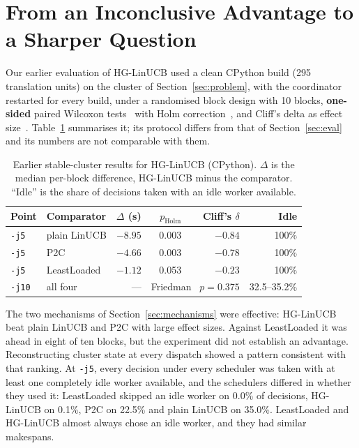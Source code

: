 \documentclass[final,5p,times,twocolumn]{elsarticle}
\begin{document}
\section{From an Inconclusive Advantage to a Sharper Question}
\label{sec:question}

Our earlier evaluation of HG-LinUCB used a clean CPython build (295 translation units) on the cluster of Section~\ref{sec:problem}, with the coordinator restarted for every build, under a randomised block design with 10 blocks, \textbf{one-sided} paired Wilcoxon tests~\cite{wilcoxon1945} with Holm correction~\cite{holm1979}, and Cliff's delta as effect size~\cite{cliff1993}. Table~\ref{tab:earlier} summarises it; its protocol differs from that of Section~\ref{sec:eval} and its numbers are not comparable with them.

\begin{table}[t]
\centering
\caption{Earlier stable-cluster results for HG-LinUCB (CPython). $\Delta$ is the median per-block difference, HG-LinUCB minus the comparator. ``Idle'' is the share of decisions taken with an idle worker available.}
\label{tab:earlier}
\footnotesize
\setlength{\tabcolsep}{3pt}
\begin{tabular}{llrrrr}
\toprule
Point & Comparator & $\Delta$ (s) & $p_{\text{Holm}}$ & Cliff's $\delta$ & Idle \\
\midrule
\texttt{-j5} & plain LinUCB & $-8.95$ & 0.003 & $-0.84$ & 100\% \\
\texttt{-j5} & P2C & $-4.66$ & 0.003 & $-0.78$ & 100\% \\
\texttt{-j5} & LeastLoaded & $-1.12$ & 0.053 & $-0.23$ & 100\% \\
\texttt{-j10} & all four & --- & \multicolumn{2}{l}{Friedman~\cite{friedman1937} $p=0.375$} & 32.5--35.2\% \\
\bottomrule
\end{tabular}
\end{table}

The two mechanisms of Section~\ref{sec:mechanisms} were effective: HG-LinUCB beat plain LinUCB and P2C with large effect sizes. Against LeastLoaded it was ahead in eight of ten blocks, but the experiment did not establish an advantage. Reconstructing cluster state at every dispatch showed a pattern consistent with that ranking. At \texttt{-j5}, every decision under every scheduler was taken with at least one completely idle worker available, and the schedulers differed in whether they used it: LeastLoaded skipped an idle worker on 0.0\% of decisions, HG-LinUCB on 0.1\%, P2C on 22.5\% and plain LinUCB on 35.0\%. LeastLoaded and HG-LinUCB almost always chose an idle worker, and they had similar makespans.
\end{document}
